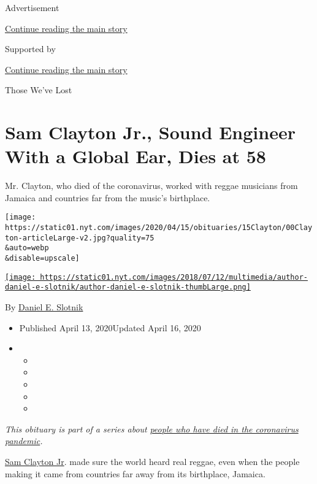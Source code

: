 Advertisement

\protect\hyperlink{after-top}{Continue reading the main story}

Supported by

\protect\hyperlink{after-sponsor}{Continue reading the main story}

Those We've Lost

\hypertarget{sam-clayton-jr-sound-engineer-with-a-global-ear-dies-at-58}{%
\section{Sam Clayton Jr., Sound Engineer With a Global Ear, Dies at
58}\label{sam-clayton-jr-sound-engineer-with-a-global-ear-dies-at-58}}

Mr. Clayton, who died of the coronavirus, worked with reggae musicians
from Jamaica and countries far from the music's birthplace.

\texttt{[image: https://static01.nyt.com/images/2020/04/15/obituaries/15Clayton/00Clayton-articleLarge-v2.jpg?quality=75\\\&auto=webp\\\&disable=upscale]}

\href{https://www.nytimes.com/by/daniel-e-slotnik}{\texttt{[image: https://static01.nyt.com/images/2018/07/12/multimedia/author-daniel-e-slotnik/author-daniel-e-slotnik-thumbLarge.png]}}

By \href{https://www.nytimes.com/by/daniel-e-slotnik}{Daniel E. Slotnik}

\begin{itemize}
\item
  Published April 13, 2020Updated April 16, 2020
\item
  \begin{itemize}
  \item
  \item
  \item
  \item
  \item
  \end{itemize}
\end{itemize}

\emph{This obituary is part of a series about}
\href{https://www.nytimes.com/series/people-who-have-died-of-the-coronavirus}{\emph{people
who have died in the coronavirus pandemic}}\emph{.}

\href{https://www.reggaeville.com/artist-details/brain-damage/news/view/rip-sam-clayton-jr/}{Sam
Clayton Jr}. made sure the world heard real reggae, even when the people
making it came from countries far away from its birthplace, Jamaica.

